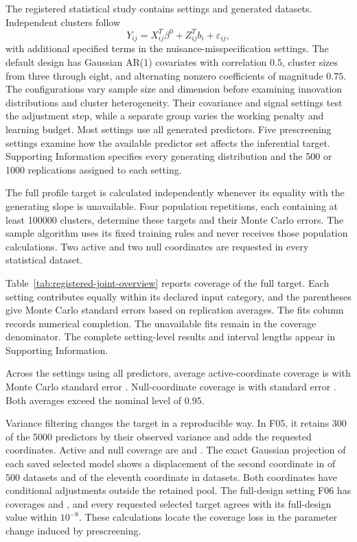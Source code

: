 The registered statistical study contains \RegisteredJointSettings{}
settings and \RegisteredJointDatasets{} generated datasets.
Independent clusters follow
\[
 Y_{ij}=X_{ij}^T\beta^0+Z_{ij}^Tb_i+\varepsilon_{ij},
\]
with additional specified terms in the nuisance-misspecification
settings. The default design has Gaussian AR(1) covariates with
correlation $0.5$, cluster sizes from three through eight, and
alternating nonzero coefficients of magnitude $0.75$. The
configurations vary sample size and dimension before examining
innovation distributions and cluster heterogeneity. Their covariance
and signal settings test the adjustment step, while a separate
group varies the working penalty and learning budget. Most settings
use all generated predictors. Five prescreening settings examine
how the available predictor set affects the inferential target.
Supporting Information specifies every generating distribution and
the 500 or 1000 replications assigned to each setting.

The full profile target is calculated independently whenever its
equality with the generating slope is unavailable. Four population
repetitions, each containing at least 100000 clusters, determine
these targets and their Monte Carlo errors. The sample algorithm
uses its fixed training rules and never receives those population
calculations. Two active and two null coordinates are requested
in every statistical dataset.

Table~\ref{tab:registered-joint-overview} reports coverage of the
full target. Each setting contributes equally within its declared
input category, and the parentheses give Monte Carlo standard errors
based on replication averages. The fits column records numerical
completion. The \RegisteredJointFailures{} unavailable fits remain
in the coverage denominator. The complete setting-level results and
interval lengths appear in Supporting Information.

Across the \RegisteredFullPredictorSettings{} settings using all
predictors, average active-coordinate coverage is
\RegisteredFullActiveCoverage{} with Monte Carlo standard error
\RegisteredFullActiveMCSE{}. Null-coordinate coverage is
\RegisteredFullNullCoverage{} with standard error
\RegisteredFullNullMCSE{}. Both averages exceed the nominal
level of $0.95$.



Variance filtering changes the target in a reproducible way. In
F05, it retains 300 of the 5000 predictors by their observed variance
and adds the requested coordinates. Active and null coverage are
\VarianceFilterActiveCoverage{} and \VarianceFilterNullCoverage{}.
The exact Gaussian projection of each saved selected model shows
a displacement of the second coordinate in
\VarianceFilterSecondShifted{} of 500 datasets and of the eleventh
coordinate in \VarianceFilterEleventhShifted{} datasets. Both
coordinates have conditional adjustments outside the retained pool.
The full-design setting F06 has coverages
\FullDesignActiveCoverage{} and \FullDesignNullCoverage{}, and
every requested selected target agrees with its full-design value
within $10^{-8}$. These calculations locate the coverage loss in
the parameter change induced by prescreening.

